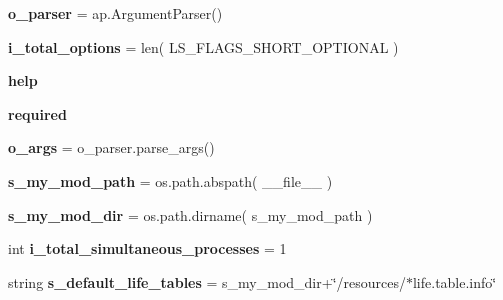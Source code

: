 \begin{DoxyCompactItemize}
\item 
{\bfseries o\+\_\+parser} = ap.\+Argument\+Parser()\hypertarget{namespacenegui_1_1negui_a0238cdb30b4db858939b3a3547a01291}{}\label{namespacenegui_1_1negui_a0238cdb30b4db858939b3a3547a01291}

\item 
{\bfseries i\+\_\+total\+\_\+options} = len( L\+S\+\_\+\+F\+L\+A\+G\+S\+\_\+\+S\+H\+O\+R\+T\+\_\+\+O\+P\+T\+I\+O\+N\+AL )\hypertarget{namespacenegui_1_1negui_a755d148e355ee43be3122668737cca98}{}\label{namespacenegui_1_1negui_a755d148e355ee43be3122668737cca98}

\item 
{\bfseries help}\hypertarget{namespacenegui_1_1negui_ab2f52d57c94461393fe55c281d73c2eb}{}\label{namespacenegui_1_1negui_ab2f52d57c94461393fe55c281d73c2eb}

\item 
{\bfseries required}\hypertarget{namespacenegui_1_1negui_a997e18ffce4f999fc997cf56e330ca14}{}\label{namespacenegui_1_1negui_a997e18ffce4f999fc997cf56e330ca14}

\item 
{\bfseries o\+\_\+args} = o\+\_\+parser.\+parse\+\_\+args()\hypertarget{namespacenegui_1_1negui_a13daffa2de8e8d9b13b95a03859f0f17}{}\label{namespacenegui_1_1negui_a13daffa2de8e8d9b13b95a03859f0f17}

\item 
{\bfseries s\+\_\+my\+\_\+mod\+\_\+path} = os.\+path.\+abspath( \+\_\+\+\_\+file\+\_\+\+\_\+ )\hypertarget{namespacenegui_1_1negui_ac3d503277c8f4b646ff8bc4a88922931}{}\label{namespacenegui_1_1negui_ac3d503277c8f4b646ff8bc4a88922931}

\item 
{\bfseries s\+\_\+my\+\_\+mod\+\_\+dir} = os.\+path.\+dirname( s\+\_\+my\+\_\+mod\+\_\+path )\hypertarget{namespacenegui_1_1negui_af56cb9927731f0b94f9bf9744ae41e4f}{}\label{namespacenegui_1_1negui_af56cb9927731f0b94f9bf9744ae41e4f}

\item 
int {\bfseries i\+\_\+total\+\_\+simultaneous\+\_\+processes} = 1\hypertarget{namespacenegui_1_1negui_ac3d7219be606c9a080eeb9b3121c1c85}{}\label{namespacenegui_1_1negui_ac3d7219be606c9a080eeb9b3121c1c85}

\item 
string {\bfseries s\+\_\+default\+\_\+life\+\_\+tables} = s\+\_\+my\+\_\+mod\+\_\+dir+\char`\"{}/resources/$\ast$life.\+table.\+info\char`\"{}\hypertarget{namespacenegui_1_1negui_aebe3cdf18a6fb06977342427f5bdf539}{}\label{namespacenegui_1_1negui_aebe3cdf18a6fb06977342427f5bdf539}


\end{DoxyCompactItemize}
